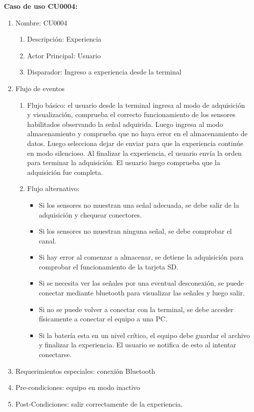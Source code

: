 	\textbf{Caso de uso CU0004:}

	\begin{enumerate} 
		\item Nombre: CU0004
		\begin{enumerate} [label*=\arabic*.]
			\item Descripción: Experiencia
			\item Actor Principal: Usuario
			\item Disparador: Ingreso a experiencia desde la terminal
		\end{enumerate}
		\item Flujo de eventos
		\begin{enumerate} [label*=\arabic*.]
			\item Flujo básico: el usuario desde la terminal ingresa al modo de adquisición y visualización, comprueba el correcto funcionamiento de los sensores habilitados observando la señal adquirida. Luego ingresa al modo almacenamiento y comprueba que no haya error en el almacenamiento de datos. Luego selecciona dejar de enviar para que la experiencia continúe en modo silencioso. Al finalizar la experiencia, el usuario envía la orden para terminar la adquisición. El usuario luego comprueba que la adquisición fue completa.
			\item Flujo alternativo:
			\begin{itemize}
				\item Si los sensores no muestran una señal adecuada, se debe salir de la adquisición y chequear conectores.
				\item Si los sensores no muestran ninguna señal, se debe comprobar el canal.
				\item Si hay error al comenzar a almacenar, se detiene la adquisición para comprobar el funcionamiento de la tarjeta SD.
				\item Si se necesita ver las señales por una eventual desconexión, se puede conectar mediante bluetooth para visualizar las señales y luego salir. 
				\item Si no se puede volver a conectar con la terminal, se debe acceder físicamente a conectar el equipo a una PC.
				\item Si la batería esta en un nivel crítico, el equipo debe guardar el archivo y finalizar la experiencia. El usuario se notifica de esto al intentar conectarse.					
			\end{itemize}				
		\end{enumerate}

		\item Requerimientos especiales: conexión Bluetooth
		\item Pre-condiciones: equipo en modo inactivo
		\item Post-Condiciones: salir correctamente de la experiencia.
	\end{enumerate}

